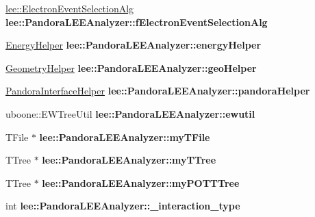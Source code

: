 \begin{DoxyCompactItemize}
\item 
\hypertarget{group__lee_gabc3e2092fa2fa08dce6f6eb6778519ce}{\hyperlink{classlee_1_1ElectronEventSelectionAlg}{lee\-::\-Electron\-Event\-Selection\-Alg} {\bfseries lee\-::\-Pandora\-L\-E\-E\-Analyzer\-::f\-Electron\-Event\-Selection\-Alg}}\label{group__lee_gabc3e2092fa2fa08dce6f6eb6778519ce}

\item 
\hypertarget{group__lee_ga15efa0b525385a8f0ac4547690d44194}{\hyperlink{classEnergyHelper}{Energy\-Helper} {\bfseries lee\-::\-Pandora\-L\-E\-E\-Analyzer\-::energy\-Helper}}\label{group__lee_ga15efa0b525385a8f0ac4547690d44194}

\item 
\hypertarget{group__lee_gaa53a7fef751a9f2aa891b067875eb19b}{\hyperlink{classGeometryHelper}{Geometry\-Helper} {\bfseries lee\-::\-Pandora\-L\-E\-E\-Analyzer\-::geo\-Helper}}\label{group__lee_gaa53a7fef751a9f2aa891b067875eb19b}

\item 
\hypertarget{group__lee_ga00fc07207cfb81cd3cbbe5a8785d3c23}{\hyperlink{classPandoraInterfaceHelper}{Pandora\-Interface\-Helper} {\bfseries lee\-::\-Pandora\-L\-E\-E\-Analyzer\-::pandora\-Helper}}\label{group__lee_ga00fc07207cfb81cd3cbbe5a8785d3c23}

\item 
\hypertarget{group__lee_gaf8493a6adc146f58425a9808bde7de2f}{uboone\-::\-E\-W\-Tree\-Util {\bfseries lee\-::\-Pandora\-L\-E\-E\-Analyzer\-::ewutil}}\label{group__lee_gaf8493a6adc146f58425a9808bde7de2f}

\item 
\hypertarget{group__lee_ga8a86ec4686558f03c8a2be30a6bbcc2a}{T\-File $\ast$ {\bfseries lee\-::\-Pandora\-L\-E\-E\-Analyzer\-::my\-T\-File}}\label{group__lee_ga8a86ec4686558f03c8a2be30a6bbcc2a}

\item 
\hypertarget{group__lee_ga20daae4b8c56ed5c2c2fd6b7b2a490dc}{T\-Tree $\ast$ {\bfseries lee\-::\-Pandora\-L\-E\-E\-Analyzer\-::my\-T\-Tree}}\label{group__lee_ga20daae4b8c56ed5c2c2fd6b7b2a490dc}

\item 
\hypertarget{group__lee_ga3c10053a4ef8cb336589fb86a5b6f587}{T\-Tree $\ast$ {\bfseries lee\-::\-Pandora\-L\-E\-E\-Analyzer\-::my\-P\-O\-T\-T\-Tree}}\label{group__lee_ga3c10053a4ef8cb336589fb86a5b6f587}

\item 
\hypertarget{group__lee_gafd61fa715317d7a54f36339589736b1e}{int {\bfseries lee\-::\-Pandora\-L\-E\-E\-Analyzer\-::\-\_\-interaction\-\_\-type}}\label{group__lee_gafd61fa715317d7a54f36339589736b1e}


\end{DoxyCompactItemize}

